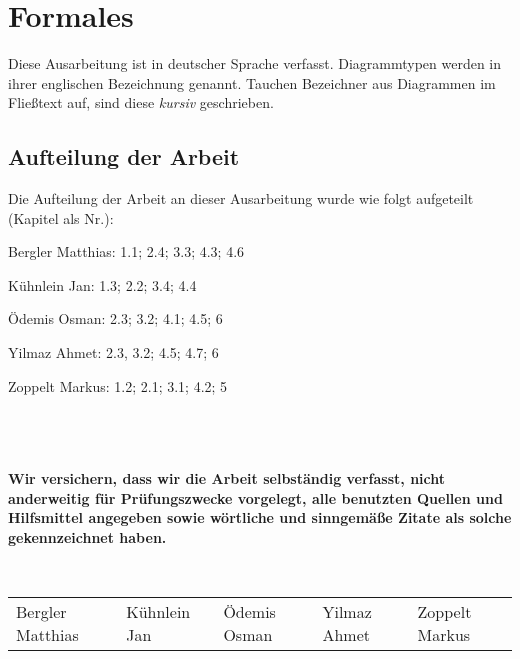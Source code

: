 \chapter*{Formales}

Diese Ausarbeitung ist in deutscher Sprache verfasst. Diagrammtypen werden in ihrer englischen Bezeichnung genannt. Tauchen Bezeichner aus Diagrammen im Fließtext auf, sind diese \emph{kursiv} geschrieben.

\section*{Aufteilung der Arbeit}
Die Aufteilung der Arbeit an dieser Ausarbeitung wurde wie folgt aufgeteilt (Kapitel als Nr.):

Bergler Matthias: 1.1; 2.4; 3.3; 4.3; 4.6

Kühnlein Jan: 1.3; 2.2; 3.4; 4.4

Ödemis Osman: 2.3; 3.2; 4.1; 4.5; 6

Yilmaz Ahmet: 2.3, 3.2; 4.5; 4.7; 6

Zoppelt Markus: 1.2; 2.1; 3.1; 4.2; 5

\ \\
\ \\
\ \\
\textbf{Wir versichern, dass wir die Arbeit selbständig verfasst, nicht anderweitig für
Prüfungszwecke vorgelegt, alle benutzten Quellen und Hilfsmittel angegeben
sowie wörtliche und sinngemäße Zitate als solche gekennzeichnet haben.}

\ \\
\begin{table}[h]
\centering
\begin{tabular}{lllll}
\hline
Bergler Matthias & Kühnlein Jan & Ödemis Osman & Yilmaz Ahmet & Zoppelt Markus \\
\end{tabular}
\end{table}
